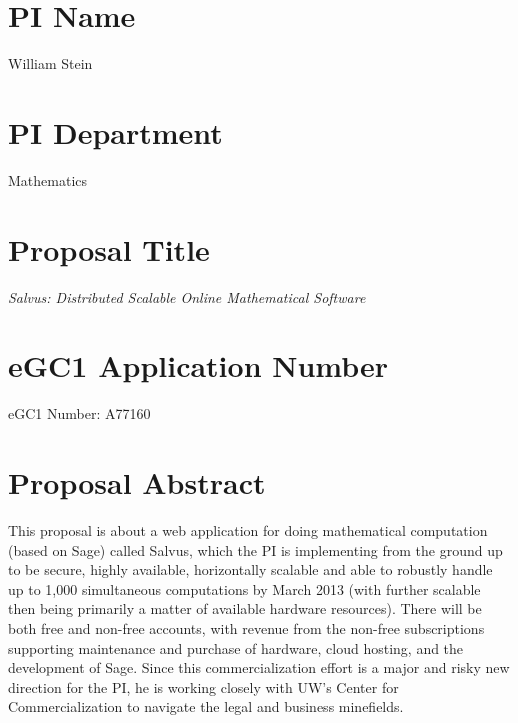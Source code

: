 \documentclass[11pt]{article}
\begin{document}
\mbox{}\vspace{4ex}

\section*{PI Name} 
William Stein


\vspace{3ex}
\section*{PI Department} 
Mathematics

\vspace{3ex}
\section*{Proposal Title} 
{\em Salvus: Distributed Scalable Online Mathematical Software}

\vspace{3ex}

\section*{eGC1 Application Number} 
eGC1 Number: A77160

\vspace{3ex}

\section*{Proposal Abstract} 
This proposal is about a web application for doing mathematical
computation (based on Sage) called Salvus, which the PI is
implementing from the ground up to be secure, highly available,
horizontally scalable and able to robustly handle up to 1,000
simultaneous computations by March 2013 (with further scalable then
being primarily a matter of available hardware resources).  There will
be both free and non-free accounts, with revenue from the non-free
subscriptions supporting maintenance and purchase of hardware, cloud
hosting, and the development of Sage.  Since this commercialization
effort is a major and risky new direction for the PI, he is working
closely with UW's Center for Commercialization to navigate the legal
and business minefields.

\vspace{3ex}
\end{document}
